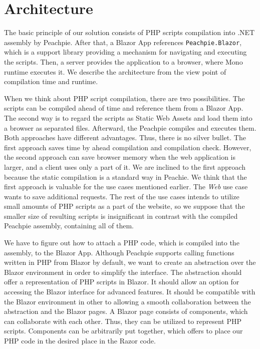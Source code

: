\section{Architecture}

The basic principle of our solution consists of PHP scripts compilation into .NET assembly by Peachpie.
After that, a Blazor App references \texttt{Peachpie.Blazor}, which is a support library providing a mechanism for navigating and executing the scripts.
Then, a server provides the application to a browser, where Mono runtime executes it.
We describe the architecture from the view point of compilation time and runtime.
\par
When we think about PHP script compilation, there are two possibilities.
The scripts can be compiled ahead of time and reference them from a Blazor App. 
The second way is to regard the scripts as Static Web Assets and load them into a browser as separated files.
Afterward, the Peachpie compiles and executes them.
Both approaches have different advantages. 
Thus, there is no silver bullet.
The first approach saves time by ahead compilation and compilation check.
However, the second approach can save browser memory when the web application is larger, and a client uses only a part of it.
We are inclined to the first approach because the static compilation is a standard way in Peachie.
We think that the first approach is valuable for the use cases mentioned earlier.
The \textit{Web} use case wants to save additional requests. 
The rest of the use cases intends to utilize small amounts of PHP scripts as a part of the website, so we suppose that the smaller size of resulting scripts is insignificant in contrast with the compiled Peachpie assembly, containing all of them. 
\par
We have to figure out how to attach a PHP code, which is compiled into the assembly, to the Blazor App.
Although Peachpie supports calling functions written in PHP from Blazor by default, we want to create an abstraction over the Blazor environment in order to simplify the interface.
The abstraction should offer a representation of PHP scripts in Blazor.
It should allow an option for accessing the Blazor interface for advanced features.
It should be compatible with the Blazor environment in other to allowing a smooth collaboration between the abstraction and the Blazor pages.
A Blazor page consists of components, which can collaborate with each other.
Thus, they can be utilized to represent PHP scripts.
Components can be arbitrarily put together, which offers to place our PHP code in the desired place in the Razor code.
